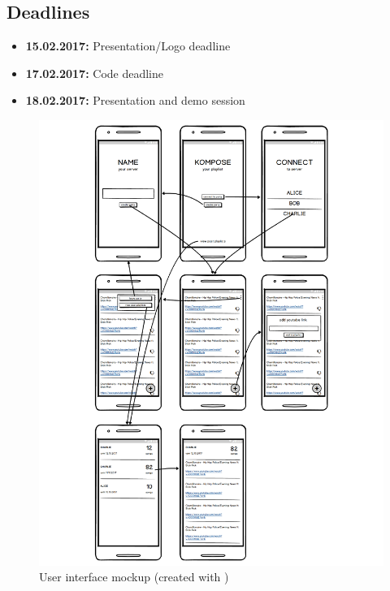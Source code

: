 \documentclass{report}
\begin{document}
\subsection*{Deadlines}
\begin{itemize}
    \item {\bf 15.02.2017:} Presentation/Logo deadline
    \item {\bf 17.02.2017:} Code deadline
    \item {\bf 18.02.2017:} Presentation and demo session
\end{itemize}



\begin{figure}
    \includegraphics[width=\textwidth]{../design/mockups.pdf}
    \caption{User interface mockup (created with \cite{balsamiq})}
\end{figure}
\end{document}
